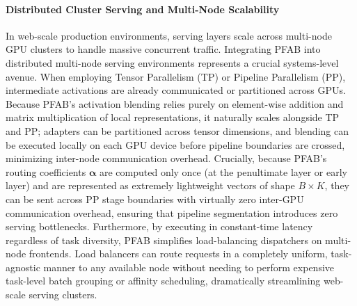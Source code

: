 \paragraph{Distributed Cluster Serving and Multi-Node Scalability}
In web-scale production environments, serving layers scale across multi-node GPU clusters to handle massive concurrent traffic. Integrating \textsc{PFAB} into distributed multi-node serving environments represents a crucial systems-level avenue. When employing Tensor Parallelism (TP) or Pipeline Parallelism (PP), intermediate activations are already communicated or partitioned across GPUs. Because \textsc{PFAB}'s activation blending relies purely on element-wise addition and matrix multiplication of local representations, it naturally scales alongside TP and PP; adapters can be partitioned across tensor dimensions, and blending can be executed locally on each GPU device before pipeline boundaries are crossed, minimizing inter-node communication overhead. Crucially, because \textsc{PFAB}'s routing coefficients $\boldsymbol{\alpha}$ are computed only once (at the penultimate layer or early layer) and are represented as extremely lightweight vectors of shape $B \times K$, they can be sent across PP stage boundaries with virtually zero inter-GPU communication overhead, ensuring that pipeline segmentation introduces zero serving bottlenecks. Furthermore, by executing in constant-time latency regardless of task diversity, \textsc{PFAB} simplifies load-balancing dispatchers on multi-node frontends. Load balancers can route requests in a completely uniform, task-agnostic manner to any available node without needing to perform expensive task-level batch grouping or affinity scheduling, dramatically streamlining web-scale serving clusters.
